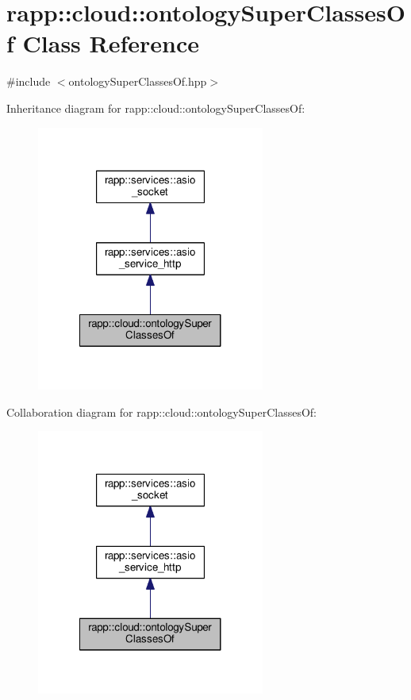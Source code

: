 \hypertarget{classrapp_1_1cloud_1_1ontologySuperClassesOf}{\section{rapp\-:\-:cloud\-:\-:ontology\-Super\-Classes\-Of Class Reference}
\label{classrapp_1_1cloud_1_1ontologySuperClassesOf}
}


{\ttfamily \#include $<$ontology\-Super\-Classes\-Of.\-hpp$>$}



Inheritance diagram for rapp\-:\-:cloud\-:\-:ontology\-Super\-Classes\-Of\-:
\nopagebreak
\begin{figure}[H]
\begin{center}
\leavevmode
\includegraphics[width=212pt]{classrapp_1_1cloud_1_1ontologySuperClassesOf__inherit__graph}
\end{center}
\end{figure}


Collaboration diagram for rapp\-:\-:cloud\-:\-:ontology\-Super\-Classes\-Of\-:
\nopagebreak
\begin{figure}[H]
\begin{center}
\leavevmode
\includegraphics[width=212pt]{classrapp_1_1cloud_1_1ontologySuperClassesOf__coll__graph}
\end{center}
\end{figure}
